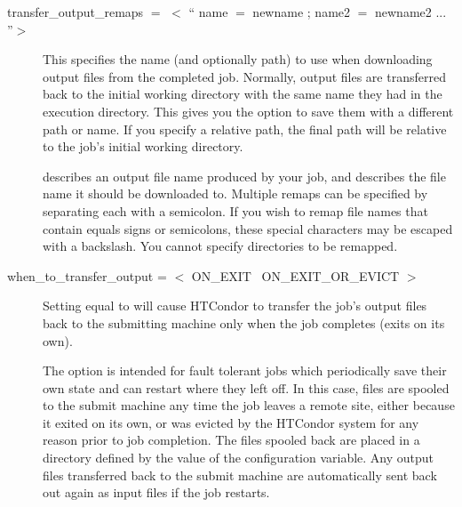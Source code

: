 \begin{description}

\label{man-condor-submit-transfer-output-remaps}
\item[transfer\_output\_remaps $=$ $<$ `` name $=$ newname ; name2 $=$ newname2 ... ''$>$ ]
This specifies the name (and optionally path) to use when downloading output
files from the completed job.  Normally, output files are transferred back
to the initial working directory with the same name they had in the execution
directory.  This gives you the option to save them with a different path
or name.  If you specify a relative path, the final path will be relative
to the job's initial working directory.

 describes an output file name produced by your job, and
 describes the file name it should be downloaded to.
Multiple remaps can be specified by separating each with a semicolon.
If you wish to remap file names that contain equals signs or
semicolons, these special characters may be escaped with a backslash.
You cannot specify directories to be remapped. 



\label{man-condor-submit-when-to-transfer-output}
\item[when\_to\_transfer\_output = $<$ ON\_EXIT \Bar\ ON\_EXIT\_OR\_EVICT $>$] 

Setting  equal to  will
cause HTCondor to transfer the job's output files back to the submitting
machine only when the job completes (exits on its own).

The  option is intended for fault tolerant
jobs which periodically save their own state and can restart where
they left off.
In this case, files are spooled to the submit machine any time the
job leaves a remote site, either because it exited on its own, or was
evicted by the HTCondor system for any reason prior to job completion.
The files spooled back are placed in a directory defined by
the value of the  configuration variable.
Any output files transferred back to the submit machine are
automatically sent back out again as input files if the job restarts.

\end{description} 


